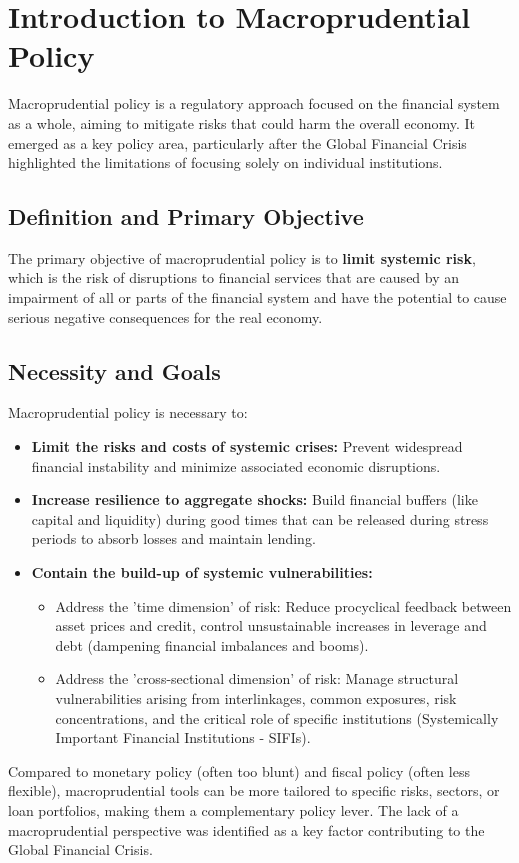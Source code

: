 \newpage



\section{Introduction to Macroprudential Policy}

Macroprudential policy is a regulatory approach focused on the financial system as a whole, aiming to mitigate risks that could harm the overall economy. It emerged as a key policy area, particularly after the Global Financial Crisis highlighted the limitations of focusing solely on individual institutions.

\subsection{Definition and Primary Objective}
The primary objective of macroprudential policy is to \textbf{limit systemic risk}, which is the risk of disruptions to financial services that are caused by an impairment of all or parts of the financial system and have the potential to cause serious negative consequences for the real economy.

\subsection{Necessity and Goals}
Macroprudential policy is necessary to:
\begin{itemize}
    \item \textbf{Limit the risks and costs of systemic crises:} Prevent widespread financial instability and minimize associated economic disruptions.
    \item \textbf{Increase resilience to aggregate shocks:} Build financial buffers (like capital and liquidity) during good times that can be released during stress periods to absorb losses and maintain lending.
    \item \textbf{Contain the build-up of systemic vulnerabilities:}
        \begin{itemize}
            \item Address the 'time dimension' of risk: Reduce procyclical feedback between asset prices and credit, control unsustainable increases in leverage and debt (dampening financial imbalances and booms).
            \item Address the 'cross-sectional dimension' of risk: Manage structural vulnerabilities arising from interlinkages, common exposures, risk concentrations, and the critical role of specific institutions (Systemically Important Financial Institutions - SIFIs).
        \end{itemize}
\end{itemize}
Compared to monetary policy (often too blunt) and fiscal policy (often less flexible), macroprudential tools can be more tailored to specific risks, sectors, or loan portfolios, making them a complementary policy lever. The lack of a macroprudential perspective was identified as a key factor contributing to the Global Financial Crisis.

